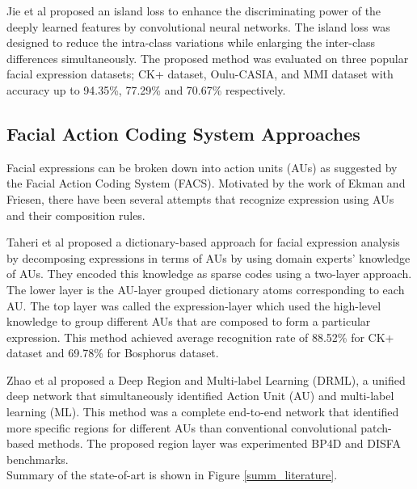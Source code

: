 \documentclass[master]{thesis-uestc}
\begin{document}
Jie et al\cite{8373844} proposed an island loss to enhance the discriminating power of the deeply learned features by convolutional neural networks. The island loss was designed to reduce the intra-class variations while enlarging the inter-class differences simultaneously. The proposed method was evaluated on three popular facial expression datasets; CK+ dataset, Oulu-CASIA, and MMI dataset with accuracy up to 94.35\%, 77.29\% and 70.67\% respectively.

\subsection*{Facial Action Coding System Approaches}
Facial expressions can be broken down into action units (AUs) as suggested by the Facial Action Coding System (FACS). Motivated by the work of Ekman and Friesen\cite{ekman}, there have been several attempts that recognize expression using AUs and their composition rules.

Taheri et al\cite{6837526} proposed a dictionary-based approach for facial expression analysis by decomposing expressions in terms of AUs by using domain experts’ knowledge of AUs. They encoded this knowledge as sparse codes using a two-layer approach. The lower layer is the AU-layer grouped dictionary atoms corresponding to each AU. The top layer was called the expression-layer which used the high-level knowledge to group different AUs that are composed to form a particular expression. This method achieved average recognition rate of 88.52\% for CK+ dataset and 69.78\% for Bosphorus dataset\cite{10.1007/978-3-540-89991-4_6}.

Zhao et al\cite{7780738} proposed a Deep Region and Multi-label Learning (DRML), a unified deep network that simultaneously identified Action Unit (AU) and multi-label learning (ML). This method was a complete end-to-end network that identified more specific regions for different AUs than conventional convolutional patch-based methods. The proposed region layer was experimented BP4D \cite{6553788} and DISFA\cite{10.1007/978-3-642-33783-3_58} benchmarks. \\
Summary of the state-of-art is shown in Figure \ref{summ_literature}.
\end{document}
